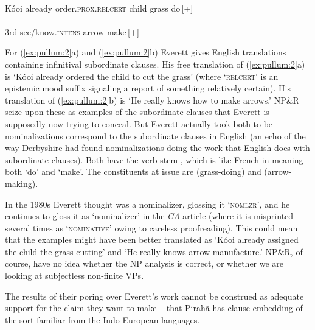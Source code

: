 \documentclass[output=paper,colorlinks,citecolor=brown
]{langscibook}
\begin{document}
\ea
\label{ex:pullum:2}
\ea \gll {} 
          
           \\
        K{\'o}{\textglotstop}oi already order.\textsc{prox}.\textsc{relcert} 
           child grass do\,[+]\\
    \ex \gll {}  
               \\
             3rd  see/know.\textsc{intens}  arrow make\,[+]\\
   \z
\z

\noindent
For (\ref{ex:pullum:2}a) and (\ref{ex:pullum:2}b) Everett gives English translations containing
infinitival subordinate clauses. His free translation of (\ref{ex:pullum:2}a) is
`K{\'o}{\textglotstop}oi already ordered the child to cut the grass'
(where `\textsc{relcert}' is an epistemic mood suffix signaling a
report of something relatively certain). His translation of (\ref{ex:pullum:2}b)
is `He really knows how to make arrows.' NP\&R seize upon these as
examples of the subordinate clauses that Everett is supposedly
now trying to conceal. But Everett actually took both to be
nominalizations correspond to the subordinate clauses in English
(an echo of the way Derbyshire had found nominalizations doing the
work that English does with subordinate clauses). Both have the
verb stem , which is like French  in meaning
both `do' and `make'. The constituents at issue are 
(grass-doing) and  (arrow-making).

In the 1980s Everett thought \mbox{} was a nominalizer,
glossing it `\textsc{nomlzr}', and he continues to gloss it as
`nominalizer' in the \textit{CA} article (where it is misprinted
several times as `\textsc{nominative}' owing to careless proofreading).
This could mean that the examples might have been better translated
as `K{\'o}{\textglotstop}oi already assigned the child the grass-cutting'
and `He really knows arrow manufacture.' NP\&R, of course, have no idea
whether the NP analysis is correct, or whether we are looking at
subjectless non-finite VPs.

The results of their poring over Everett's work cannot be construed as
adequate support for the claim they want to make -- that Pirah{\~a}
has clause embedding of the sort familiar from the Indo-European
languages.
\end{document}
